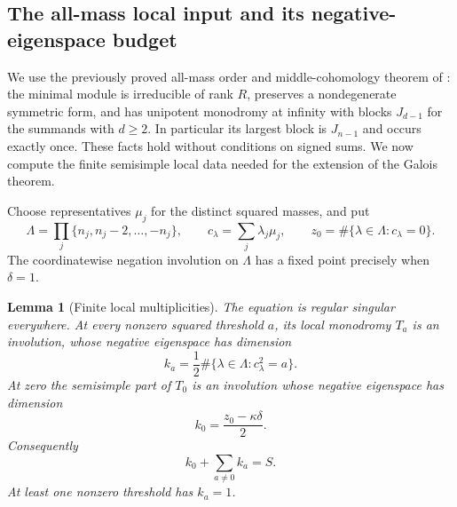 \documentclass[11pt,a4paper]{article}
\newtheorem{lemma}[theorem]{Lemma}
\theoremstyle{definition}
\theoremstyle{remark}
\numberwithin{equation}{section}
\begin{document}
\subsection{The all-mass local input and its negative-eigenspace budget}

We use the previously proved all-mass order and middle-cohomology
theorem of \cite{p5:Keio032}: the minimal module is irreducible of
rank $R$, preserves a nondegenerate symmetric form, and has
unipotent monodromy at infinity with blocks $J_{d-1}$ for the
summands with $d\geq2$.  In particular its largest block is
$J_{n-1}$ and occurs exactly once.  These facts hold without
conditions on signed sums.  We now compute the finite semisimple
local data needed for the extension of the Galois theorem.

Choose representatives $\mu_j$ for the distinct squared masses,
and put
\[
 \Lambda=\prod_j\{n_j,n_j-2,\ldots,-n_j\},\qquad
 c_\lambda=\sum_j\lambda_j\mu_j,\qquad
 z_0=\#\{\lambda\in\Lambda:c_\lambda=0\}.
\]
The coordinatewise negation involution on $\Lambda$ has a fixed
point precisely when $\delta=1$.

\begin{lemma}[Finite local multiplicities]\label{p7:be:local-budget}
The equation is regular singular everywhere. At every nonzero
squared threshold $a$, its local monodromy $T_a$ is an involution,
whose negative eigenspace has dimension
\[
 k_a=\frac12\#\{\lambda\in\Lambda:c_\lambda^2=a\}.
\]
At zero the semisimple part of $T_0$ is an involution whose negative
eigenspace has dimension
\[
                 k_0=\frac{z_0-\kappa\delta}{2}.
\]
Consequently
\begin{equation}\label{p7:be:budget}
                         k_0+\sum_{a\ne0}k_a=S.
\end{equation}
At least one nonzero threshold has $k_a=1$.
\end{lemma}
\end{document}

